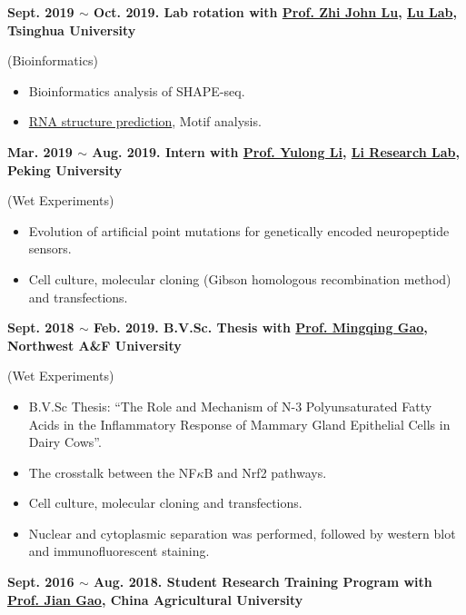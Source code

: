 \textbf{
    Sept. 2019 $\sim$ Oct. 2019. Lab rotation with \href{https://life.tsinghua.edu.cn/lifeen/info/1034/1083.htm}{Prof. Zhi John Lu}, \href{https://lulab.life.tsinghua.edu.cn/labhome/home/}{Lu Lab}, Tsinghua University
}

(Bioinformatics)

\begin{itemize}
    \item Bioinformatics analysis of SHAPE-seq.
    \item \href{https://scholar.google.com/citations?view_op=view_citation&hl=zh-CN&user=ojSVoWQAAAAJ&citation_for_view=ojSVoWQAAAAJ:IjCSPb-OGe4C}{RNA structure prediction}\cite{zhu2021integrative}, Motif analysis.
\end{itemize}

\textbf{
    Mar. 2019 $\sim$ Aug. 2019. Intern with \href{https://www.bio.pku.edu.cn/enhomes/news/teacher_dis/43.html}{Prof. Yulong Li}, \href{http://www.yulonglilab.org/}{Li Research Lab}, Peking University
}

(Wet Experiments)

\begin{itemize}
    \item Evolution of artificial point mutations for genetically encoded neuropeptide sensors.
    \item Cell culture, molecular cloning (Gibson homologous recombination method) and transfections.
\end{itemize}

\textbf{
    Sept. 2018 $\sim$ Feb. 2019. B.V.Sc. Thesis with \href{https://faculty.nwu.edu.cn/gaomingqing/en/index.htm}{Prof. Mingqing Gao}, Northwest A\&F University
}

(Wet Experiments)

\begin{itemize}
    \item B.V.Sc Thesis: ``The Role and Mechanism of N-3 Polyunsaturated Fatty Acids in the Inflammatory Response of Mammary Gland Epithelial Cells in Dairy Cows''.
    \item The crosstalk between the NF$\kappa$B and Nrf2 pathways.
    \item Cell culture, molecular cloning and transfections.
    \item Nuclear and cytoplasmic separation was performed, followed by western blot and immunofluorescent staining.
\end{itemize}

\textbf{
    Sept. 2016 $\sim$ Aug. 2018. Student Research Training Program with \href{https://cvm.cau.edu.cn/art/2017/9/12/art_41957_71.html}{Prof. Jian Gao}, China Agricultural University
}

